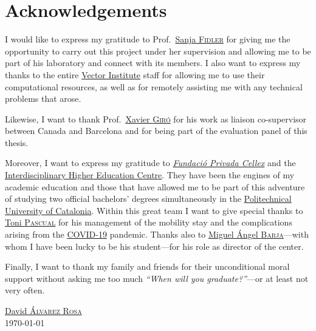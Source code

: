 \chapter*{Acknowledgements}


I would like to express my gratitude to Prof.\
\href{https://www.cs.utoronto.ca/~fidler/}{Sanja \textsc{Fidler}} for giving me
the opportunity to carry out this project under her supervision and allowing me
to be part of his laboratory and connect with its members. I also want to
express my thanks to the entire \href{https://vectorinstitute.ai/}{Vector
  Institute} staff for allowing me to use their computational resources, as
well as for remotely assisting me with any technical problems that arose.

Likewise, I want to thank Prof.\
\href{https://imatge.upc.edu/web/people/xavier-giro}{Xavier \textsc{Giró}} for
his work as liaison co-supervisor between Canada and Barcelona and for being
part of the evaluation panel of this thesis.

Moreover, I want to express my gratitude to
\href{http://cellex-mpq.icfo.eu/about_2/}{\itshape Fundació Privada Cellex} and
the \href{https://cfis.upc.edu/en}{Interdisciplinary Higher Education
  Centre}. They have been the engines of my academic education and those that
have allowed me to be part of this adventure of studying two official
bachelors' degrees simultaneously in the
\href{https://www.upc.edu/en}{Politechnical University of Catalonia}. Within
this great team I want to give special thanks to
\href{https://spcom.upc.edu/en/people/antonio-pascual-iserte}{Toni
  \textsc{Pascual}} for his management of the mobility stay and the
complications arising from the
\href{https://en.wikipedia.org/wiki/Covid-19}{COVID-19} pandemic. Thanks also
to \href{https://mat.upc.edu/en/people/miguel.angel.barja}{Miguel Ángel
  \textsc{Barja}}---with whom I have been lucky to be his student---for his
role as director of the center.

Finally, I want to thank my family and friends for their unconditional moral
support without asking me too much \textit{``When will you graduate?''}---or at
least not very often.

\begin{flushright}
  \href{https://david.alvarezrosa.com/}{David \textsc{Álvarez Rosa}}\\
  \today
\end{flushright}

\begin{center}
\end{center}



